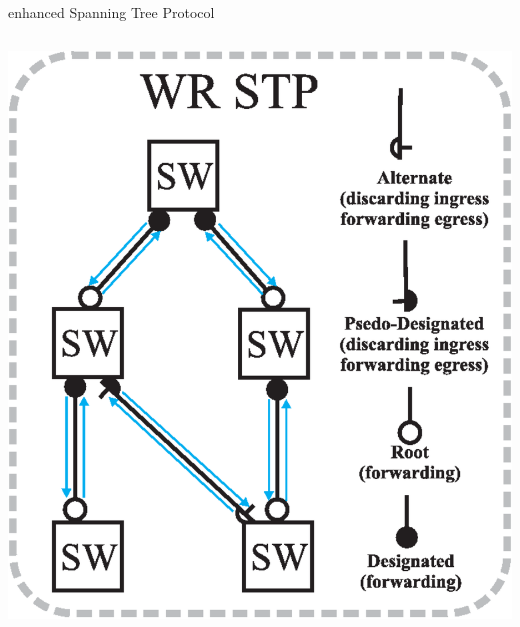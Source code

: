 \documentclass[compress,red]{beamer}
\begin{document}
\begin{frame}{enhanced Spanning Tree Protocol}
\begin{columns}[c]
      \begin{center}
	\includegraphics[width=1.1\textwidth]{robustness/portRoles_v2.pdf}
      \end{center}

 \end{columns}

\end{frame}
\end{document}
